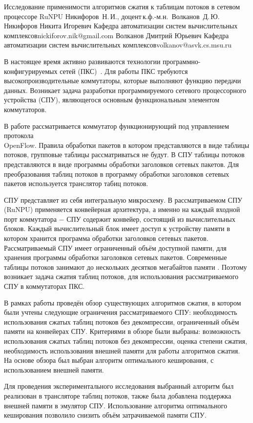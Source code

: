 \begin{lmrarticle}
{Исследование применимости алгоритмов сжатия к таблицам потоков в сетевом процессоре RuNPU}
    {Никифоров~Н.\,И., доцент\,к.ф.-м.н.~Волканов~Д.\,Ю.}
\TwoAuthor%
{Никифоров Никита Игоревич}
    {Кафедра автоматизации систем вычислительных комплексов}{nickiforov.nik@gmail.com}
{Волканов Дмитрий Юрьевич}
    {Кафедра автоматизации систем вычислительных комплексов}{volkanov@asvk.cs.msu.ru}

В настоящее время активно развиваются технологии программно-конфигурируемых сетей (ПКС)~\cite{smelopen}. Для работы ПКС требуются высокопроизводительные коммутаторы, 
которые выполняют функцию передачи данных. Возникает задача разработки программируемого сетевого процессорного устройства (СПУ),
являющегося основным функциональным элементом коммутаторов.

В работе рассматривается коммутатор функционирующий под управлением протокола\\ OpenFlow.
Правила обработки пакетов в котором представляются в виде таблицы потоков, групповые таблицы рассматриваться не будут.
В СПУ таблицы потоков представляются в виде программы обработки заголовков сетевых пакетов.
Для преобразования таблиц потоков в программу обработки заголовков сетевых пакетов используется транслятор табиц потоков.

СПУ представляет из себя интегральную микросхему. В рассматриваемом СПУ (RuNPU) применяется конвейерная архитектура,
а именно на каждый входной порт коммутатора $-$ СПУ содержит конвейер, состоящий из вычислительных блоков. Каждый вычислительный блок имеет доступ к 
устройству памяти в котором хранится программа обработки заголовков сетевых пакетов. Рассматриваемый СПУ имеет ограниченный объём доступной
памяти, для хранения программы обработки заголовков сетевых пакетов.
Современные таблицы потоков занимают до нескольких десятков мегабайтов памяти \cite{rottenstreich2016optimal}. Поэтому возникает задача сжатия таблиц потоков,
для использования рассматриваемого СПУ в коммутаторах ПКС.

В рамках работы проведён обзор существующих алгоритмов сжатия, в котором были учтены следующие ограничения рассматриваемого СПУ:
необходимость использования сжатых таблиц потоков без декомпрессии, ограниченный объём памяти на конвейерах СПУ. Критериями в обзоре
были выбраны: возможность использования сжатых таблиц потоков без декомпрессии, оценка степени сжатия, необходимость использования внешней памяти
для работы алгоритмов сжатия. На основе обзора был выбран алгоритм оптимального кеширования, с использованием внешней памяти.

Для проведения экспериментального исследования выбранный алгоритм был реализован в трансляторе таблиц потоков, также была добавлена поддержка внешней памяти в 
эмулятор СПУ. Использование алгоритма оптимального кеширования позволило снизить объём затрачиваемой памяти СПУ.\\
\begin{lmrreferences}
\end{lmrreferences}
\end{lmrarticle}
